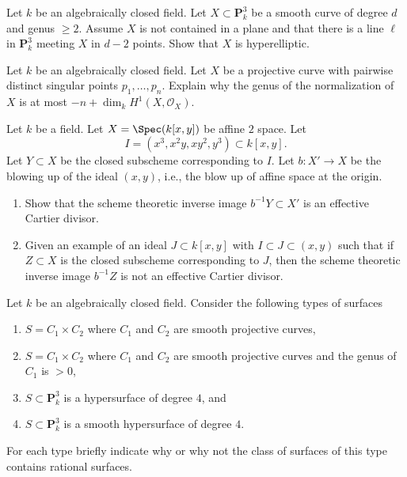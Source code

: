\begin{exercise}
\label{exercise-hyperelliptic}
Let $k$ be an algebraically closed field. Let $X \subset \mathbf{P}^3_k$
be a smooth curve of degree $d$ and genus $\geq 2$. Assume $X$
is not contained in a plane and that there is
a line $\ell$ in $\mathbf{P}^3_k$ meeting $X$ in $d - 2$ points.
Show that $X$ is hyperelliptic.
\end{exercise}

\begin{exercise}
\label{exercise-singular}
Let $k$ be an algebraically closed field. Let $X$ be a projective
curve with pairwise distinct singular points $p_1, \ldots, p_n$.
Explain why the genus of the normalization of $X$ is at most
$-n + \dim_k H^1(X, \mathcal{O}_X)$.
\end{exercise}

\begin{exercise}
\label{exercise-how-many-blowups}
Let $k$ be a field. Let $X = \Spec(k[x, y])$ be affine $2$ space.
Let
$$
I = (x^3, x^2y, xy^2, y^3) \subset k[x, y].
$$
Let $Y \subset X$ be the closed subscheme corresponding to $I$.
Let $b : X' \to X$ be the blowing up of the ideal $(x, y)$, i.e.,
the blow up of affine space at the origin.
\begin{enumerate}
\item Show that the scheme theoretic inverse image $b^{-1}Y \subset X'$
is an effective Cartier divisor.
\item Given an example of an ideal $J \subset k[x, y]$
with $I \subset J \subset (x, y)$ such that if $Z \subset X$
is the closed subscheme corresponding to $J$, then the scheme theoretic
inverse image $b^{-1}Z$ is not an effective Cartier divisor.
\end{enumerate}
\end{exercise}

\begin{exercise}
\label{exercise-rational-surface}
Let $k$ be an algebraically closed field. Consider the following
types of surfaces
\begin{enumerate}
\item $S = C_1 \times C_2$ where $C_1$ and $C_2$ are smooth projective curves,
\item $S = C_1 \times C_2$ where $C_1$ and $C_2$ are smooth projective curves
and the genus of $C_1$ is $> 0$,
\item $S \subset \mathbf{P}^3_k$ is a hypersurface of degree $4$, and
\item $S \subset \mathbf{P}^3_k$ is a smooth hypersurface of degree $4$.
\end{enumerate}
For each type briefly indicate why or why not the class of surfaces of
this type contains rational surfaces.
\end{exercise}

